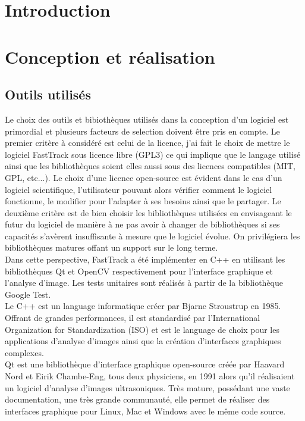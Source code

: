 \chapter{Introduction}


\chapter{Conception et réalisation}

	\section{Outils utilisés}
	
	Le choix des outils et bibiothèques utilisés dans la conception d'un logiciel est primordial et plusieurs facteurs de selection doivent être pris en compte.
	Le premier critère à considéré est celui de la licence, j'ai fait le choix de mettre le logiciel FastTrack sous licence libre (GPL3) ce qui implique que le langage utilisé ainsi que les bibliothèques soient elles aussi sous des licences compatibles (MIT, GPL, etc...). Le choix d'une licence open-source est évident dans le cas d'un logiciel scientifique, l'utilisateur pouvant alors vérifier comment le logiciel fonctionne, le modifier pour l'adapter à ses besoins ainsi que le partager.
	Le deuxième critère est de bien choisir les bibliothèques utilisées en envisageant le futur du logiciel de manière à ne pas avoir à changer de bibliothèques si ses capacités s'avèrent insuffisante à mesure que le logiciel évolue. On privilégiera les bibliothèques matures offant un support sur le long terme.\\
	
	Dans cette perspective, FastTrack a été implémenter en C++ en utilisant les bibliothèques Qt et OpenCV respectivement pour l'interface graphique et l'analyse d'image. Les tests unitaires sont réalisés à partir de la bibliothèque Google Test.\\
	
	Le C++ est un language informatique créer par Bjarne Stroustrup en 1985. Offrant de grandes performances, il est standardisé par l'International Organization for Standardization (ISO) et est le language de choix pour les applications d'analyse d'images ainsi que la création d'interfaces graphiques complexes.\\
	
	Qt est une bibliothèque d'interface graphique open-source créée par Haavard Nord et Eirik Chambe-Eng, tous deux physiciens, en 1991 alors qu'il réalisaient un logiciel d'analyse d'images ultrasoniques. Très mature, possédant une vaste documentation, une très grande communauté, elle permet de réaliser des interfaces graphique pour Linux, Mac et Windows avec le même code source.\\
	
